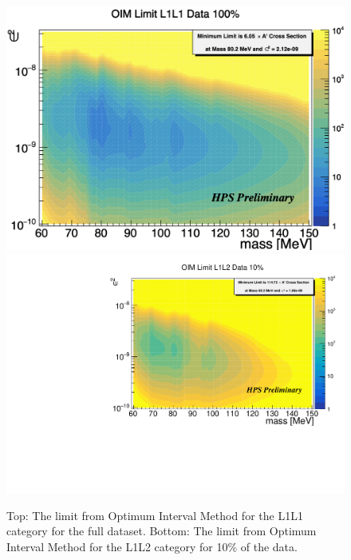 \begin{figure}[t]
    \centering
    \includegraphics[width=.85\textwidth]{figs/Results/oim_L1L1_unblind.pdf}
    \includegraphics[width=.85\textwidth]{figs/Results/oim_L1L2.pdf}
    \caption{Top: The limit from Optimum Interval Method for the L1L1 category for the full dataset. Bottom: The limit from Optimum Interval Method for the L1L2 category for 10\% of the data.}
    \label{fig:OIM}
\end{figure}


\clearpage




